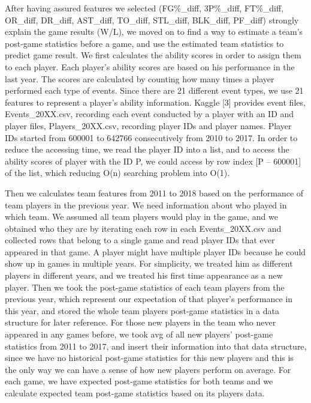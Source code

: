 \documentclass[12pt]{article}
\begin{document}
\quad After having assured features we selected (FG\%\_diff, 3P\%\_diff, FT\%\_diff, OR\_diff, DR\_diff, AST\_diff, TO\_diff, STL\_diff, BLK\_diff, PF\_diff) strongly explain the game results (W/L), we moved on to find a way to estimate a team's post-game statistics before a game, and use the estimated team statistics to predict game result. We first calculates the ability scores in order to assign them to each player. Each player's ability scores are based on his performance in the last year. The scores are calculated by counting how many times a player performed each type of events. Since there are 21 different event types, we use 21 features to represent a player's ability information. Kaggle [3] provides event files, Events\_20XX.csv, recording each event conducted by a player with an ID and player files, Players\_20XX.csv, recording player IDs and player names. Player IDs started from 600001 to 642766 consecutively from 2010 to 2017. In order to reduce the accessing time, we read the player ID into a list, and to access the ability scores of player with the ID P, we could access by row index [P – 600001] of the list, which reducing O(n) searching problem into O(1).

\quad Then we calculates team features from 2011 to 2018 based on the performance of team players in the previous year. We need information about who played in which team. We assumed all team players would play in the game, and we obtained who they are by iterating each row in each Events\_20XX.csv and collected rows that belong to a single game and read player IDs that ever appeared in that game. A player might have multiple player IDs because he could show up in games in multiple years. For simplicity, we treated him as different players in different years, and we treated his first time appearance as a new player. Then we took the post-game statistics of each team players from the previous year, which represent our expectation of that player's performance in this year, and stored the whole team players post-game statistics in a data structure for later reference. For those new players in the team who never appeared in any games before, we took avg of all new players' post-game statistics from 2011 to 2017, and insert their information into that data structure, since we have no historical post-game statistics for this new players and this is the only way we can have a sense of how new players perform on average. For each game, we have expected post-game statistics for both teams and we calculate expected team post-game statistics based on its players data. 
\end{document}
